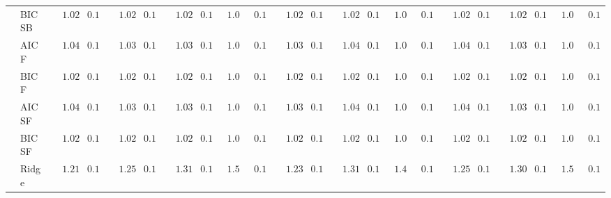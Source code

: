 \begin{tabular}{ll|ll|llllll|llllll|llllll}
 & BIC SB  & $\phantom{00}1.02$ & $\phantom{0}0.10$ & $\phantom{00}1.02$ & $\phantom{0}0.10$ & $\phantom{00}1.02$ & $\phantom{0}0.11$ & $\phantom{0}1.03$ & $\phantom{0}0.11$ & $\phantom{00}1.02$ & $\phantom{0}0.11$ & $\phantom{00}1.02$ & $\phantom{0}0.10$ & $\phantom{0}1.03$ & $\phantom{0}0.11$ & $\phantom{00}1.02$ & $\phantom{0}0.10$ & $\phantom{00}1.02$ & $\phantom{0}0.11$ & $\phantom{0}1.03$ & $\phantom{0}0.11$ \\
 & AIC F  & $\phantom{00}1.04$ & $\phantom{0}0.11$ & $\phantom{00}1.03$ & $\phantom{0}0.11$ & $\phantom{00}1.03$ & $\phantom{0}0.11$ & $\phantom{0}1.04$ & $\phantom{0}0.11$ & $\phantom{00}1.03$ & $\phantom{0}0.10$ & $\phantom{00}1.04$ & $\phantom{0}0.10$ & $\phantom{0}1.03$ & $\phantom{0}0.11$ & $\phantom{00}1.04$ & $\phantom{0}0.11$ & $\phantom{00}1.03$ & $\phantom{0}0.11$ & $\phantom{0}1.03$ & $\phantom{0}0.11$ \\
 & BIC F  & $\phantom{00}1.02$ & $\phantom{0}0.10$ & $\phantom{00}1.02$ & $\phantom{0}0.10$ & $\phantom{00}1.02$ & $\phantom{0}0.11$ & $\phantom{0}1.03$ & $\phantom{0}0.11$ & $\phantom{00}1.02$ & $\phantom{0}0.11$ & $\phantom{00}1.02$ & $\phantom{0}0.10$ & $\phantom{0}1.03$ & $\phantom{0}0.11$ & $\phantom{00}1.02$ & $\phantom{0}0.10$ & $\phantom{00}1.02$ & $\phantom{0}0.10$ & $\phantom{0}1.03$ & $\phantom{0}0.11$ \\
 & AIC SF  & $\phantom{00}1.04$ & $\phantom{0}0.11$ & $\phantom{00}1.03$ & $\phantom{0}0.11$ & $\phantom{00}1.03$ & $\phantom{0}0.11$ & $\phantom{0}1.04$ & $\phantom{0}0.11$ & $\phantom{00}1.03$ & $\phantom{0}0.10$ & $\phantom{00}1.04$ & $\phantom{0}0.10$ & $\phantom{0}1.03$ & $\phantom{0}0.11$ & $\phantom{00}1.04$ & $\phantom{0}0.11$ & $\phantom{00}1.03$ & $\phantom{0}0.11$ & $\phantom{0}1.03$ & $\phantom{0}0.11$ \\
 & BIC SF  & $\phantom{00}1.02$ & $\phantom{0}0.10$ & $\phantom{00}1.02$ & $\phantom{0}0.10$ & $\phantom{00}1.02$ & $\phantom{0}0.11$ & $\phantom{0}1.03$ & $\phantom{0}0.11$ & $\phantom{00}1.02$ & $\phantom{0}0.11$ & $\phantom{00}1.02$ & $\phantom{0}0.10$ & $\phantom{0}1.03$ & $\phantom{0}0.11$ & $\phantom{00}1.02$ & $\phantom{0}0.10$ & $\phantom{00}1.02$ & $\phantom{0}0.10$ & $\phantom{0}1.03$ & $\phantom{0}0.11$ \\
 & Ridge  & $\phantom{00}1.21$ & $\phantom{0}0.14$ & $\phantom{00}1.25$ & $\phantom{0}0.15$ & $\phantom{00}1.31$ & $\phantom{0}0.17$ & $\phantom{0}1.54$ & $\phantom{0}0.17$ & $\phantom{00}1.23$ & $\phantom{0}0.14$ & $\phantom{00}1.31$ & $\phantom{0}0.16$ & $\phantom{0}1.48$ & $\phantom{0}0.17$ & $\phantom{00}1.25$ & $\phantom{0}0.14$ & $\phantom{00}1.30$ & $\phantom{0}0.16$ & $\phantom{0}1.52$ & $\phantom{0}0.16$ \\

\end{tabular}
